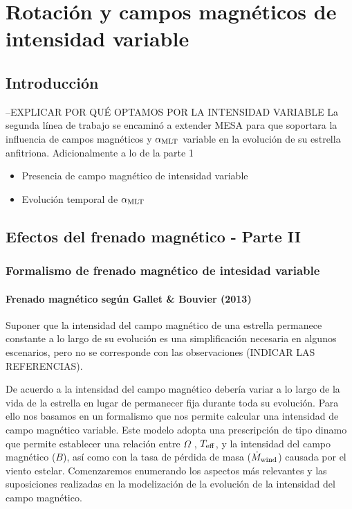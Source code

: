 \chapter{Rotación y campos magnéticos de intensidad variable}\label{ch:sexto-capitulo}

\section{Introducción}
--EXPLICAR POR QUÉ OPTAMOS POR LA INTENSIDAD VARIABLE
La segunda línea de trabajo se encaminó a extender MESA para que soportara la influencia de campos magnéticos y $\alpha_{\mathrm{MLT}}$ variable en la evolución de su estrella anfitriona.
Adicionalmente a lo de la parte 1
\begin{itemize}
	\item Presencia de campo magnético de intensidad variable
	\item Evolución temporal de $\alpha_{\mathrm{MLT}}$
\end{itemize}
\section{Efectos del frenado magnético - Parte II}

\subsection{Formalismo de frenado magnético de intesidad variable} 

\subsubsection{Frenado magnético según Gallet \& Bouvier (2013)}
Suponer que la intensidad del campo magnético de una estrella permanece constante a lo largo de su evolución es una simplificación necesaria en algunos escenarios, pero no se corresponde con las observaciones (INDICAR LAS REFERENCIAS). \par

De acuerdo a \cite{Gallet2013} la intensidad del campo magnético debería variar a lo largo de la vida de la estrella en lugar de permanecer fija durante toda su evolución. Para ello nos basamos en un formalismo que nos permite calcular una intensidad de campo magnético variable. Este modelo adopta una prescripción de tipo dinamo que permite establecer una relación entre $\Omega$ , $T_{\mathrm{eff}}$, y la intensidad del campo magnético ($B$), así como con la tasa de pérdida de masa ($\Dot{M}_{\mathrm{wind}}$) causada por el viento estelar. Comenzaremos enumerando los aspectos más relevantes y las suposiciones realizadas en la modelización de la evolución de la intensidad del campo magnético.\par 


